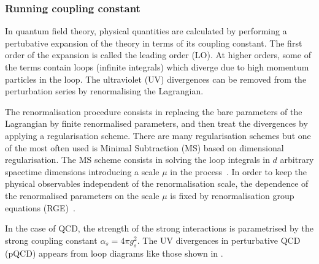 \subsubsection{Running coupling constant}

In quantum field theory, physical quantities are calculated by performing a pertubative expansion of the theory in terms of its coupling constant. The first order of the expansion is called the leading order (LO). At higher orders, some of the terms contain loops (infinite integrals) which diverge due to high momentum particles in the loop. The ultraviolet (UV) divergences can be removed from the perturbation series by renormalising the Lagrangian.

The renormalisation procedure consists in replacing the bare parameters of the Lagrangian by finite renormalised parameters, and then treat the divergences by applying a regularisation scheme. There are many regularisation schemes but one of the most often used is Minimal Subtraction (MS) based on dimensional regularisation. The MS scheme consists in solving the loop integrals in $d$ arbitrary spacetime dimensions introducing a scale $\mu$ in the process~\cite{Renomalization}. In order to keep the physical observables independent of the renormalisation scale, the dependence of the renormalised parameters on the scale $\mu$ is fixed by renormalisation group equations (RGE)~\cite{Renomalization}.

In the case of QCD, the strength of the strong interactions is parametrised by the strong coupling constant $\alpha_{s} = 4{\pi}g_{s}^{2}$. The UV divergences in perturbative QCD (pQCD) appears from loop diagrams like those shown in .

